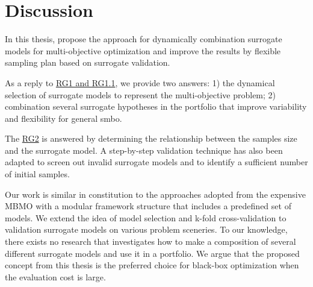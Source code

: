
    \section{Discussion}

        In this thesis, propose the approach for dynamically combination surrogate models for multi-objective optimization and improve the results by flexible sampling plan based on surrogate validation.

        As a reply to \hyperref[RG1]{RG1 and RG1.1}, we provide two answers: 1) the dynamical selection of surrogate models to represent the multi-objective problem;  2) combination several surrogate hypotheses in the portfolio that improve variability and flexibility for general \gls{smbo}.
        
        The \hyperref[RG2]{RG2} is answered by determining the relationship between the samples size and the surrogate model. A step-by-step validation technique has also been adapted to screen out invalid surrogate models and to identify a sufficient number of initial samples.

        Our work is similar in constitution to the approaches adopted from the expensive MBMO \cite{SoftSurvey} with a modular framework structure that includes a predefined set of models. We extend the idea of model selection and k-fold cross-validation to validation surrogate models on various problem sceneries. To our knowledge, there exists no research that investigates how to make a composition of several different surrogate models and use it in a portfolio. We argue that the proposed concept from this thesis is the preferred choice for black-box optimization when the evaluation cost is large.

























